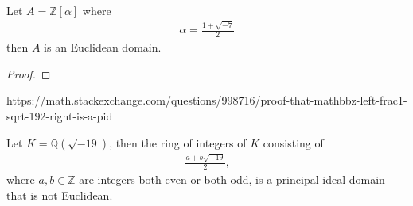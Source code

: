 \begin{exmbox}
    \begin{example}
        Let \(A = \mathbb{Z}[\alpha]\) where
        \begin{align*}
            \alpha = \frac{1 + \sqrt{-7}}{2}
        \end{align*}
        then \(A\) is an Euclidean domain.
    \end{example}
\end{exmbox}
\begin{proof}
\end{proof}
https://math.stackexchange.com/questions/998716/proof-that-mathbbz-left-frac1-sqrt-192-right-is-a-pid
\begin{exmbox}
    \begin{example}
        Let \(K = \mathbb{Q}(\sqrt{-19})\), then the ring of integers of \(K\) consisting of
        \begin{align*}
            \frac{a + b \sqrt{-19}}{2} \text{,}
        \end{align*}
        where \(a, b \in \mathbb{Z}\) are integers both even or both odd, is a principal ideal domain that is not Euclidean.
    \end{example}
\end{exmbox}
